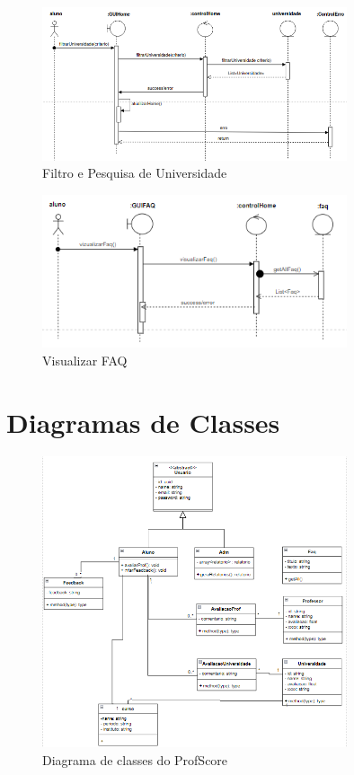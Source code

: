 \documentclass[12pt]{article}
\begin{document}
\begin{figure}[H]
  \centering
  \includegraphics[width=0.8\textwidth]{diagramas/i12-filtro-pesq-univ.png}
  \caption{Filtro e Pesquisa de Universidade}
  \label{fig:i12-filtro-pesq-univ}
\end{figure}

\begin{figure}[H]
  \centering
  \includegraphics[width=0.8\textwidth]{diagramas/i13-visualizar-faq.png}
  \caption{Visualizar FAQ}
  \label{fig:i13-visual-faq}
\end{figure}

\section{Diagramas de Classes}

\begin{figure}[H] %
    \centering
    \includegraphics[width=0.8\textwidth]{diagramas/diag-classes-com-faq.png}
    \caption{Diagrama de classes do ProfScore}
    \label{fig:diag-classes}
\end{figure}
\end{document}
